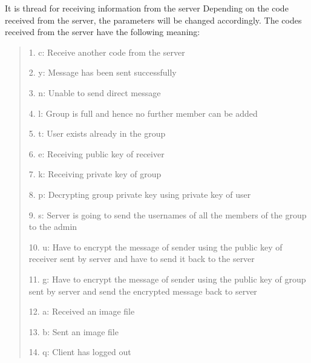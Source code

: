 \documentclass[letterpaper,10pt,english]{sphinxmanual}
\begin{document}
\begin{fulllineitems}
\label{\detokenize{client:client.receiving_func}}
\sphinxAtStartPar
It is thread for receiving information from the server
Depending on the code received from the server, the parameters will be changed accordingly.
The codes received from the server have the following meaning:
\begin{quote}

\begin{DUlineblock}{0em}
\item[] 1. c: Receive another code from the server
\item[] 2. y: Message has been sent successfully
\item[] 3. n: Unable to send direct message
\item[] 4. l: Group is full and hence no further member can be added
\item[] 5. t: User exists already in the group
\item[] 6. e: Receiving public key of receiver
\item[] 7. k: Receiving private key of group
\item[] 8. p: Decrypting group private key using private key of user
\item[] 9. s: Server is going to send the usernames of all the members of the group to the admin
\item[] 10. u: Have to encrypt the message of sender using the public key of receiver sent by server and have to send it back to the server
\item[] 11. g: Have to encrypt the message of sender using the public key of group sent by server and send the encrypted message back to server
\item[] 12. a: Received an image file
\item[] 13. b: Sent an image file
\item[] 14. q: Client has logged out
\end{DUlineblock}
\end{quote}

\end{fulllineitems}

\end{document}
